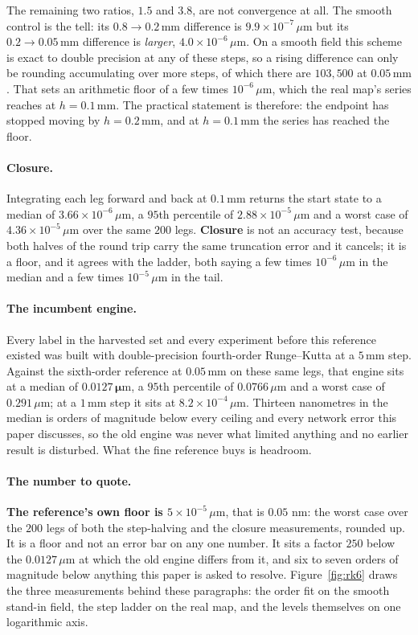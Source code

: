 \documentclass[11pt,a4paper]{article}
\newcommand{\um}{\ensuremath{\,\mu\mathrm{m}}}
\newcommand{\mm}{\ensuremath{\,\mathrm{mm}}}
\begin{document}
The remaining two ratios, $1.5$ and $3.8$, are not convergence at all. The smooth
control is the tell: its $0.8 \to 0.2\mm$ difference is $9.9 \times 10^{-7}\um$
but its $0.2 \to 0.05\mm$ difference is \emph{larger}, $4.0 \times
10^{-6}\um$. On a smooth field this scheme is exact to double precision at any of
these steps, so a rising difference can only be rounding accumulating over more
steps, of which there are $103{,}500$ at $0.05\mm$. That sets an arithmetic floor
of a few times $10^{-6}\um$, which the real map's series reaches at
$h = 0.1\mm$. The practical statement is therefore: the endpoint has stopped
moving by $h = 0.2\mm$, and at $h = 0.1\mm$ the series has reached the floor.

\paragraph{Closure.} Integrating each leg forward and back at $0.1\mm$ returns
the start state to a median of $3.66 \times 10^{-6}\um$, a $95$th percentile of
$2.88 \times 10^{-5}\um$ and a worst case of $4.36 \times 10^{-5}\um$ over the
same $200$ legs. \textbf{Closure} is not an accuracy test, because both halves of
the round trip carry the same truncation error and it cancels; it is a floor, and
it agrees with the ladder, both saying a few times $10^{-6}\um$ in the median and
a few times $10^{-5}\um$ in the tail.

\paragraph{The incumbent engine.} Every label in the harvested set and every
experiment before this reference existed was built with double-precision
fourth-order Runge--Kutta at a $5\mm$ step. Against the sixth-order reference at
$0.05\mm$ on these same legs, that engine sits at a median of
$\mathbf{0.0127\um}$, a $95$th percentile of $0.0766\um$ and a worst case of
$0.291\um$; at a $1\mm$ step it sits at $8.2 \times 10^{-4}\um$. Thirteen
nanometres in the median is orders of magnitude below every ceiling and every
network error this paper discusses, so the old engine was never what limited
anything and no earlier result is disturbed. What the fine reference buys is
headroom.

\paragraph{The number to quote.} \textbf{The reference's own floor is
$5 \times 10^{-5}\um$}, that is $0.05$ nm: the worst case over the $200$ legs of
both the step-halving and the closure measurements, rounded up. It is a floor and
not an error bar on any one number. It sits a factor $250$ below the $0.0127\um$
at which the old engine differs from it, and six to seven orders of magnitude
below anything this paper is asked to resolve. Figure~\ref{fig:rk6} draws the
three measurements behind these paragraphs: the order fit on the smooth
stand-in field, the step ladder on the real map, and the levels themselves on
one logarithmic axis.
\end{document}
